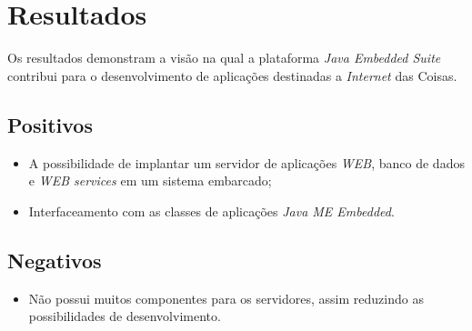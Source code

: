 \section{Resultados}

Os resultados demonstram a visão na qual a plataforma \textit{Java Embedded
Suite} contribui para o desenvolvimento de aplicações destinadas a
\textit{Internet} das Coisas.

\subsection{Positivos}

\begin{itemize}

    \item A possibilidade de implantar um servidor de aplicações \textit{WEB},
    banco de dados e \textit{WEB services} em um sistema embarcado;

    \item Interfaceamento com as classes de aplicações \textit{Java ME
    Embedded}.

\end{itemize}

\subsection{Negativos}

\begin{itemize}

    \item Não possui muitos componentes para os servidores, assim reduzindo as
    possibilidades de desenvolvimento.

\end{itemize}
